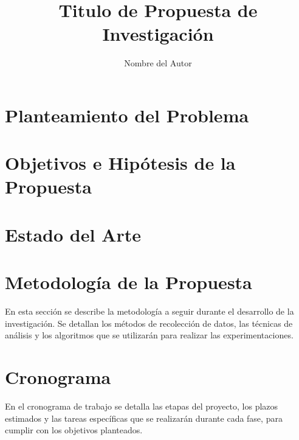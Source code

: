\documentclass[a4paper,12pt]{article}
\author{Nombre del Autor}
\title{Titulo de Propuesta de Investigación}
\begin{document}


\thispagestyle{empty}  %
\newpage
\tableofcontents
\newpage
\begin{abstract}
  
\end{abstract}

\newpage
\begin{abstract}
  
\end{abstract}

\newpage
\section{Planteamiento del Problema}


\section{Objetivos e Hipótesis de la Propuesta}


\newpage

\section{Estado del Arte}

\newpage

\section{Metodología de la Propuesta}
En esta sección se describe la metodología a seguir durante el desarrollo de la investigación. Se detallan los métodos de recolección de datos, las técnicas de análisis y los algoritmos que se utilizarán para realizar las experimentaciones.
\cite{simpson2019largeannotatedmedicalimage}


\newpage


\section{Cronograma}
En el cronograma de trabajo se detalla las etapas del proyecto, los plazos estimados y las tareas específicas que se realizarán durante cada fase, para cumplir con los objetivos planteados.
\end{document}

